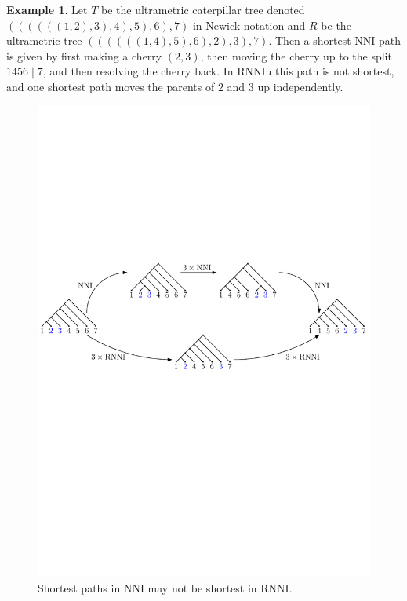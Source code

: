 \documentclass[11pt]{amsart}
\theoremstyle{definition}
\newtheorem{example}[lemma]{Example}
\newcommand{\nni}{\mathrm{NNI}}
\newcommand{\rnni}{\mathrm{RNNI}}
\newcommand{\rnniu}{\mathrm{RNNIu}}
\begin{document}
\begin{example}
\label{ex_caterpillars}
Let $T$ be the ultrametric caterpillar tree denoted $((((((1, 2), 3), 4), 5), 6), 7)$ in Newick notation \autocite{felsenstein1990newick} and $R$ be the ultrametric tree $((((((1, 4), 5), 6), 2), 3), 7)$.
Then a shortest $\nni$ path is given by first making a cherry $(2,3)$, then moving the cherry up to the split $1456 \mid 7$, and then resolving the cherry back.
In $\rnniu$ this path is not shortest, and one shortest path moves the parents of $2$ and $3$ up independently.

\begin{figure}[ht]
\centering
\includegraphics[width=\textwidth]{NNI_VS_rNNI.pdf}
\caption{Shortest paths in $\nni$ may not be shortest in $\rnni$.}
\label{NNI_VS_rNNI.pdf}
\end{figure}
\end{example}
\end{document}
